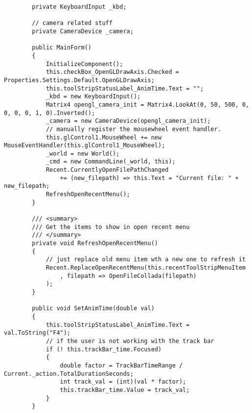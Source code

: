 \begin{scriptsize}
\begin{verbatim}
        private KeyboardInput _kbd;

        // camera related stuff
        private CameraDevice _camera;

        public MainForm()
        {
            InitializeComponent();
            this.checkBox_OpenGLDrawAxis.Checked = Properties.Settings.Default.OpenGLDrawAxis;
            this.toolStripStatusLabel_AnimTime.Text = "";
            _kbd = new KeyboardInput();
            Matrix4 opengl_camera_init = Matrix4.LookAt(0, 50, 500, 0, 0, 0, 0, 1, 0).Inverted();
            _camera = new CameraDevice(opengl_camera_init);
            // manually register the mousewheel event handler.
            this.glControl1.MouseWheel += new MouseEventHandler(this.glControl1_MouseWheel);
            _world = new World();
            _cmd = new CommandLine(_world, this);
            Recent.CurrentlyOpenFilePathChanged
                += (new_filepath) => this.Text = "Current file: " + new_filepath;
            RefreshOpenRecentMenu();
        }

        /// <summary>
        /// Get the items to show in open recent menu
        /// </summary>
        private void RefreshOpenRecentMenu()
        {
            // just replace old menu item wth a new one to refresh it
            Recent.ReplaceOpenRecentMenu(this.recentToolStripMenuItem
                , filepath => OpenFileCollada(filepath)
            );
        }

        public void SetAnimTime(double val)
        {
            this.toolStripStatusLabel_AnimTime.Text = val.ToString("F4");
            // if the user is not working with the track bar
            if (! this.trackBar_time.Focused)
            {
                double factor = TrackBarTimeRange / Current._action.TotalDurationSeconds;
                int track_val = (int)(val * factor);
                this.trackBar_time.Value = track_val;
            }
        }


\end{verbatim}
\end{scriptsize}
